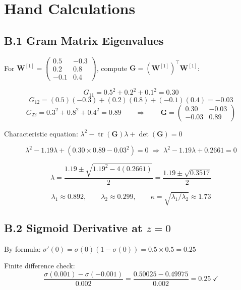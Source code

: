 \documentclass[12pt,a4paper]{article}
\begin{document}
\newpage

\section{Hand Calculations}

\subsection*{B.1 Gram Matrix Eigenvalues}

For $\mathbf{W}^{[1]}=\begin{pmatrix}0.5&-0.3\\0.2&0.8\\-0.1&0.4\end{pmatrix}$,
compute $\mathbf{G}=(\mathbf{W}^{[1]})^\top\mathbf{W}^{[1]}$:

\[
  G_{11} = 0.5^2 + 0.2^2 + 0.1^2 = 0.30
\]
\[
  G_{12} = (0.5)(-0.3)+(0.2)(0.8)+(-0.1)(0.4) = -0.03
\]
\[
  G_{22} = 0.3^2+0.8^2+0.4^2 = 0.89
  \qquad\Longrightarrow\qquad
  \mathbf{G} = \begin{pmatrix}0.30&-0.03\\-0.03&0.89\end{pmatrix}
\]

Characteristic equation: $\lambda^2 - \operatorname{tr}(\mathbf{G})\lambda + \det(\mathbf{G}) = 0$

\[
  \lambda^2 - 1.19\lambda + (0.30 \times 0.89 - 0.03^2) = 0
  \;\Rightarrow\; \lambda^2 - 1.19\lambda + 0.2661 = 0
\]

\[
  \lambda = \frac{1.19 \pm \sqrt{1.19^2 - 4(0.2661)}}{2}
  = \frac{1.19 \pm \sqrt{0.3517}}{2}
\]

\[
  \boxed{\lambda_1 \approx 0.892, \qquad \lambda_2 \approx 0.299,
  \qquad \kappa = \sqrt{\lambda_1/\lambda_2} \approx 1.73}
\]

\subsection*{B.2 Sigmoid Derivative at $z=0$}

By formula: $\sigma'(0) = \sigma(0)(1-\sigma(0)) = 0.5 \times 0.5 = \mathbf{0.25}$

Finite difference check:
\[
  \frac{\sigma(0.001)-\sigma(-0.001)}{0.002}
  = \frac{0.50025 - 0.49975}{0.002} = 0.25 \;\checkmark
\]
\end{document}
